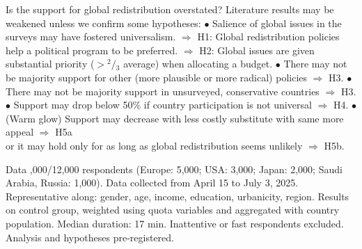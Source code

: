 \documentclass[aspectratio=169,xcolor=dvipsnames, 11pt,mathserif]{beamer}
\begin{document}
\begin{frame}{Is the support for global redistribution overstated?}
\bbsp
\ip Literature results may be weakened unless we confirm some hypotheses:
\ip $\bullet$ Salience of global issues in the surveys may have fostered universalism. %
\ip $\Rightarrow$ H1: Global redistribution policies help a political program to be preferred.
\ip $\Rightarrow$ H2: Global issues are given substantial priority ($>\!^{2}\!/\!_{3}$ average) when allocating a budget.
\ip $\bullet$ There may not be majority support for other (more plausible or more radical) policies $\Rightarrow$ H3.
\ip $\bullet$ There may not be majority support in unsurveyed, conservative countries $\Rightarrow$ H3.
\ip $\bullet$ Support may drop below 50\% if country participation is not universal $\Rightarrow$ H4.
\ip $\bullet$ (Warm glow) Support may decrease with less costly substitute with same more appeal $\Rightarrow$ H5a \\ 
\quad or it may hold only for as long as global redistribution seems unlikely $\Rightarrow$ H5b.
\ee
\end{frame}

\begin{frame}{Data\label{data}}
  \vspace{.1cm}
\bbvs
{},000/12,000 respondents (Europe: 5,000; USA: 3,000; Japan: 2,000; Saudi Arabia, Russia: 1,000).
\ip Data collected from April 15 to July 3, 2025.
\ip Representative along: gender, age, income, education, urbanicity, region. \hyperlink{representativeness}{} 
\ip Results on control group, weighted using quota variables and aggregated with country population.
\ip Median duration: 17 min. Inattentive or fast respondents excluded.
\ip Analysis and hypotheses pre-registered.
\ee
\end{frame}

\end{document}
